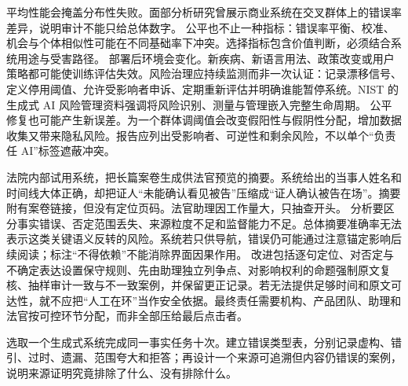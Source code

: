 平均性能会掩盖分布性失败。面部分析研究曾展示商业系统在交叉群体上的错误率差异，说明审计不能只给总体数字。\parencite{buolamwini2018} 公平也不止一种指标：错误率平衡、校准、机会与个体相似性可能在不同基础率下冲突。选择指标包含价值判断，必须结合系统用途与受害路径。 部署后环境会变化。新疾病、新语言用法、政策改变或用户策略都可能使训练评估失效。风险治理应持续监测而非一次认证：记录漂移信号、定义停用阈值、允许受影响者申诉、定期重新评估并明确谁能暂停系统。NIST 的生成式 AI 风险管理资料强调将风险识别、测量与管理嵌入完整生命周期。\parencite{nist2024} 公平修复也可能产生新误差。为一个群体调阈值会改变假阳性与假阴性分配，增加数据收集又带来隐私风险。报告应列出受影响者、可逆性和剩余风险，不以单个“负责任 AI”标签遮蔽冲突。

法院内部试用系统，把长篇案卷生成供法官预览的摘要。系统给出的当事人姓名和时间线大体正确，却把证人“未能确认看见被告”压缩成“证人确认被告在场”。摘要附有案卷链接，但没有定位页码。法官助理因工作量大，只抽查开头。 分析要区分事实错误、否定范围丢失、来源粒度不足和监督能力不足。总体摘要准确率无法表示这类关键语义反转的风险。系统若只供导航，错误仍可能通过注意锚定影响后续阅读；标注“不得依赖”不能消除界面因果作用。 改进包括逐句定位、对否定与不确定表达设置保守规则、先由助理独立列争点、对影响权利的命题强制原文复核、抽样审计一致与不一致案例，并保留更正记录。若无法提供足够时间和原文可达性，就不应把“人工在环”当作安全依据。最终责任需要机构、产品团队、助理和法官按可控环节分配，而非全部压给最后点击者。

\begin{tcolorbox}[breakable,colback=white,colframe=blue!30!black,title={专题研读任务},fonttitle=\bfseries]
选取一个生成式系统完成同一事实任务十次。建立错误类型表，分别记录虚构、错引、过时、遗漏、范围夸大和拒答；再设计一个来源可追溯但内容仍错误的案例，说明来源证明究竟排除了什么、没有排除什么。
\end{tcolorbox}

